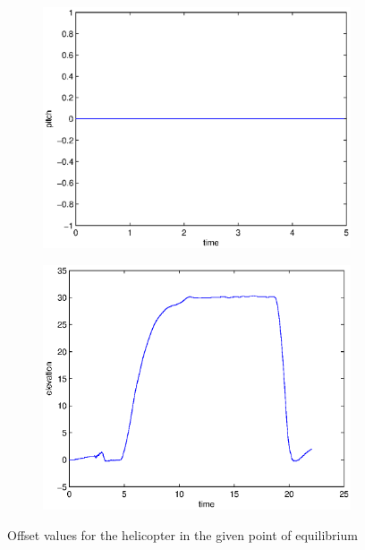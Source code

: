 \begin{figure}[H]
\begin{subfigure}{0.5\textwidth}
    \includegraphics[width=1\linewidth]{Part1_Pictures/pitch_offset.eps} 
\end{subfigure}
\begin{subfigure}{0.5\textwidth}
    \includegraphics[width=1\linewidth]{Part1_Pictures/elevation_offset.eps}
\end{subfigure}
\caption{Offset values for the helicopter in the given point of equilibrium}
\label{fig:offsets}
\end{figure}